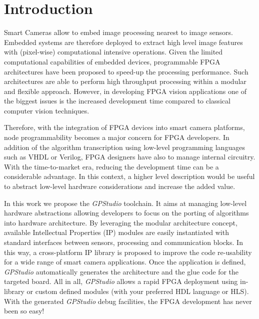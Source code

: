 \chapter*{Introduction}

Smart Cameras allow to embed image processing nearest to image sensors. Embedded systems are therefore deployed to extract high level image features with (pixel-wise) computational intensive operations. Given the limited computational capabilities of embedded devices, programmable FPGA architectures have been proposed to speed-up the processing performance. Such architectures are able to perform high throughput processing within a modular and flexible approach. However, in developing FPGA vision applications one of the biggest issues is the increased development time compared to classical computer vision techniques.

Therefore, with the integration of FPGA devices into smart camera platforms, node programmability becomes a major concern for FPGA developers. In addition of the algorithm transcription using low-level programming languages such as VHDL or Verilog, FPGA designers have also to manage internal circuitry.
With the time-to-market era, reducing the development time can be a considerable advantage. In this context,
a higher level description would be useful to abstract low-level hardware considerations and increase the added value. 

In this work we propose the \textit{GPStudio} toolchain. It aims at managing low-level hardware abstractions allowing developers to focus on the porting of algorithms into hardware architecture. By leveraging the modular architecture concept, available Intellectual Properties (IP) modules are easily instantiated with standard interfaces between sensors, processing and communication blocks. In this way, a cross-platform IP library is proposed to improve the code re-usability for a wide range of smart camera applications. Once the application is defined, \textit{GPStudio} automatically generates the architecture and the glue code for the targeted board. 
All in all, \textit{GPStudio} allows a rapid FPGA deployment using in-library or custom defined modules (with your preferred HDL language or HLS). With the generated \textit{GPStudio} debug facilities, the FPGA development has never been so easy! 
